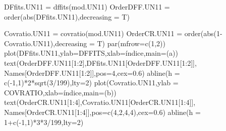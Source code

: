 \documentclass[
]{article}
\newenvironment{Shaded}{\begin{snugshade}}{\end{snugshade}}
\newcommand{\AttributeTok}[1]{\textcolor[rgb]{0.77,0.63,0.00}{#1}}
\newcommand{\DecValTok}[1]{\textcolor[rgb]{0.00,0.00,0.81}{#1}}
\newcommand{\FloatTok}[1]{\textcolor[rgb]{0.00,0.00,0.81}{#1}}
\newcommand{\FunctionTok}[1]{\textcolor[rgb]{0.00,0.00,0.00}{#1}}
\newcommand{\NormalTok}[1]{#1}
\newcommand{\OtherTok}[1]{\textcolor[rgb]{0.56,0.35,0.01}{#1}}
\newcommand{\SpecialCharTok}[1]{\textcolor[rgb]{0.00,0.00,0.00}{#1}}
\newcommand{\StringTok}[1]{\textcolor[rgb]{0.31,0.60,0.02}{#1}}
\begin{document}
\begin{Shaded}
\begin{Highlighting}[]
\NormalTok{DFfits.UN11 }\OtherTok{=} \FunctionTok{dffits}\NormalTok{(mod.UN11)}
\NormalTok{OrderDFF.UN11 }\OtherTok{=} \FunctionTok{order}\NormalTok{(}\FunctionTok{abs}\NormalTok{(DFfits.UN11),}\AttributeTok{decreasing =}\NormalTok{ T)}

\NormalTok{Covratio.UN11 }\OtherTok{=} \FunctionTok{covratio}\NormalTok{(mod.UN11)}
\NormalTok{OrderCR.UN11 }\OtherTok{=} \FunctionTok{order}\NormalTok{(}\FunctionTok{abs}\NormalTok{(}\DecValTok{1}\SpecialCharTok{{-}}\NormalTok{Covratio.UN11),}\AttributeTok{decreasing =}\NormalTok{ T)}
\FunctionTok{par}\NormalTok{(}\AttributeTok{mfrow=}\FunctionTok{c}\NormalTok{(}\DecValTok{1}\NormalTok{,}\DecValTok{2}\NormalTok{))}
\FunctionTok{plot}\NormalTok{(DFfits.UN11,}\AttributeTok{ylab=}\StringTok{\textquotesingle{}DFFITS\textquotesingle{}}\NormalTok{,}\AttributeTok{xlab=}\StringTok{\textquotesingle{}índice\textquotesingle{}}\NormalTok{,}\AttributeTok{main=}\StringTok{\textquotesingle{}(a)\textquotesingle{}}\NormalTok{)}
\FunctionTok{text}\NormalTok{(OrderDFF.UN11[}\DecValTok{1}\SpecialCharTok{:}\DecValTok{2}\NormalTok{],DFfits.UN11[OrderDFF.UN11[}\DecValTok{1}\SpecialCharTok{:}\DecValTok{2}\NormalTok{]],}
\NormalTok{     Names[OrderDFF.UN11[}\DecValTok{1}\SpecialCharTok{:}\DecValTok{2}\NormalTok{]],}\AttributeTok{pos=}\DecValTok{4}\NormalTok{,}\AttributeTok{cex=}\FloatTok{0.6}\NormalTok{)}
\FunctionTok{abline}\NormalTok{(}\AttributeTok{h =} \FunctionTok{c}\NormalTok{(}\SpecialCharTok{{-}}\DecValTok{1}\NormalTok{,}\DecValTok{1}\NormalTok{)}\SpecialCharTok{*}\DecValTok{2}\SpecialCharTok{*}\FunctionTok{sqrt}\NormalTok{(}\DecValTok{3}\SpecialCharTok{/}\DecValTok{199}\NormalTok{),}\AttributeTok{lty=}\DecValTok{2}\NormalTok{)}
\FunctionTok{plot}\NormalTok{(Covratio.UN11,}\AttributeTok{ylab =} \StringTok{\textquotesingle{}COVRATIO\textquotesingle{}}\NormalTok{,}\AttributeTok{xlab=}\StringTok{\textquotesingle{}índice\textquotesingle{}}\NormalTok{,}\AttributeTok{main=}\StringTok{\textquotesingle{}(b)\textquotesingle{}}\NormalTok{)}
\FunctionTok{text}\NormalTok{(OrderCR.UN11[}\DecValTok{1}\SpecialCharTok{:}\DecValTok{4}\NormalTok{],Covratio.UN11[OrderCR.UN11[}\DecValTok{1}\SpecialCharTok{:}\DecValTok{4}\NormalTok{]],}
\NormalTok{     Names[OrderCR.UN11[}\DecValTok{1}\SpecialCharTok{:}\DecValTok{4}\NormalTok{]],}\AttributeTok{pos=}\FunctionTok{c}\NormalTok{(}\DecValTok{4}\NormalTok{,}\DecValTok{2}\NormalTok{,}\DecValTok{4}\NormalTok{,}\DecValTok{4}\NormalTok{),}\AttributeTok{cex=}\FloatTok{0.6}\NormalTok{)}
\FunctionTok{abline}\NormalTok{(}\AttributeTok{h =} \DecValTok{1}\SpecialCharTok{+}\FunctionTok{c}\NormalTok{(}\SpecialCharTok{{-}}\DecValTok{1}\NormalTok{,}\DecValTok{1}\NormalTok{)}\SpecialCharTok{*}\DecValTok{3}\SpecialCharTok{*}\DecValTok{3}\SpecialCharTok{/}\DecValTok{199}\NormalTok{,}\AttributeTok{lty=}\DecValTok{2}\NormalTok{)}
\end{Highlighting}
\end{Shaded}
\end{document}
